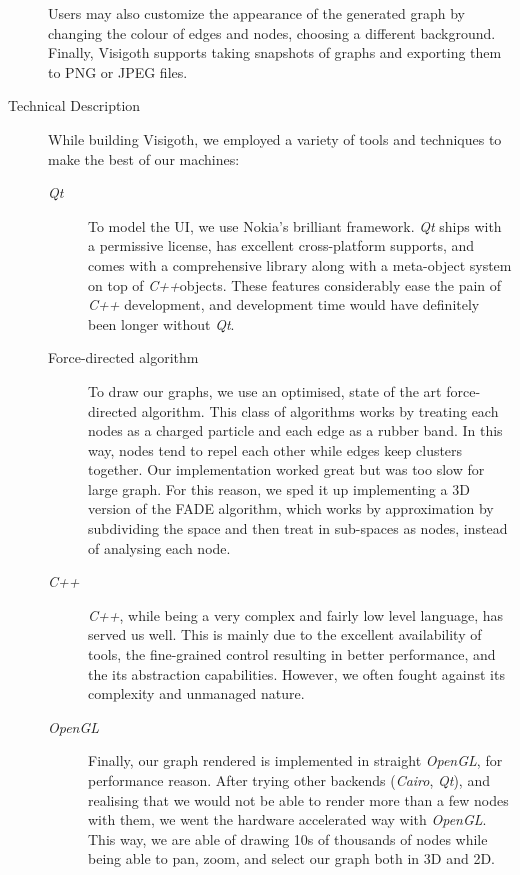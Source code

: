 \documentclass[a4paper,11pt]{article}
\newcommand{\buzz}[1]{\emph{#1}}
\newcommand{\Qt}{\buzz{Qt}}
\newcommand{\Cpp}{\buzz{C++}}
\newcommand{\OpenGL}{\buzz{OpenGL}}
\begin{document}
\begin{description}
  Users may also customize the appearance of the generated graph by
  changing the colour of edges and nodes, choosing a different
  background. Finally, Visigoth supports taking snapshots of graphs
  and exporting them to PNG or JPEG files.

\item[Technical Description]

  While building Visigoth, we employed a variety of tools and techniques to make
  the best of our machines:

  \begin{description}
    \item[\Qt] To model the UI, we use Nokia's brilliant framework. \Qt
      ships with a permissive license, has excellent cross-platform supports,
      and comes with a comprehensive library along with a meta-object system on
      top of \Cpp objects. These features considerably ease the pain of \Cpp
      development, and development time would have definitely been longer
      without \Qt.

    \item[Force-directed algorithm] To draw our graphs, we use an optimised,
      state of the art force-directed algorithm. This class of algorithms works
      by treating each nodes as a charged particle and each edge as a rubber
      band. In this way, nodes tend to repel each other while edges keep
      clusters together. Our implementation worked great but was too slow for
      large graph. For this reason, we sped it up implementing a 3D version of
      the FADE algorithm, which works by approximation by subdividing the space
      and then treat in sub-spaces as nodes, instead of analysing each node.

    \item[\Cpp] \Cpp, while being a very complex and fairly low level language,
      has served us well. This is mainly due to the excellent availability of
      tools, the fine-grained control resulting in better performance, and the
      its abstraction capabilities. However, we often fought against its
      complexity and unmanaged nature.

    \item[\OpenGL] Finally, our graph rendered is implemented in straight
      \OpenGL, for performance reason. After trying other backends
      (\buzz{Cairo}, \Qt), and realising that we would not be able to render
      more than a few nodes with them, we went the hardware accelerated way with
      \OpenGL. This way, we are able of drawing 10s of thousands of nodes while
      being able to pan, zoom, and select our graph both in 3D and 2D.
  \end{description}


\end{description}
\end{document}
